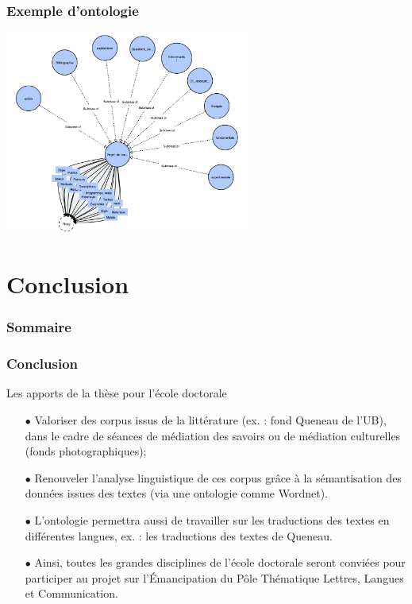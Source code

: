 \documentclass[xcolor=dvipsnames]{beamer}
\begin{document}
\begin{frame}[fragile]
\frametitle{Exemple d'ontologie}
		\includegraphics[height = 6.7cm]{images/Ontologie_2.png}
\end{frame}



\section{Conclusion}
\begin{frame}
\frametitle{Sommaire}
\tableofcontents[currentsection]
\end{frame}

\begin{frame}[fragile]
\frametitle{Conclusion}
\begin{block}{Les apports de la thèse pour l'école doctorale}
	\small{
		\begin{itemize}
			\item[$\bullet$]Valoriser des corpus issus de la littérature (ex. : fond Queneau de l'UB), dans le cadre de séances de médiation des savoirs ou de médiation culturelles (fonds photographiques);
			\item[$\bullet$]Renouveler l'analyse linguistique de ces corpus grâce à la sémantisation des données issues des textes (via une ontologie comme Wordnet).
			\item[$\bullet$]L'ontologie permettra aussi de travailler sur les traductions des textes en différentes langues, ex. : les traductions des textes de Queneau.
			\item[$\bullet$]Ainsi, toutes les grandes disciplines de l'école doctorale seront conviées pour participer au projet sur l'Émancipation du Pôle Thématique Lettres, Langues et Communication.
	\end{itemize}}
\end{block}
\end{frame}
\end{document}
